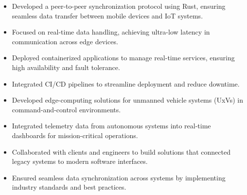 \par\smallskip
\noindent
\begin{minipage}{20cm}
  \begin{minipage}{9.75cm}
    \begin{itemize}
      \item Developed a peer-to-peer synchronization protocol using Rust, ensuring seamless data transfer between mobile devices and IoT systems.
      \item Focused on real-time data handling, achieving ultra-low latency in communication across edge devices.
    \end{itemize}
  \end{minipage}
  \hfill
  \begin{minipage}{9.75cm}
    \begin{itemize}
      \item Deployed containerized applications to manage real-time services, ensuring high availability and fault tolerance.
      \item Integrated CI/CD pipelines to streamline deployment and reduce downtime.
    \end{itemize}
  \end{minipage}
\end{minipage}
\par\smallskip
\divider

\par\smallskip
\noindent
\begin{minipage}{20cm}
  \begin{minipage}{9.75cm}
    \begin{itemize}
      \item Developed edge-computing solutions for unmanned vehicle systems (UxVs) in command-and-control environments.
      \item Integrated telemetry data from autonomous systems into real-time dashboards for mission-critical operations.
    \end{itemize}
  \end{minipage}
  \hfill
  \begin{minipage}{9.75cm}
    \begin{itemize}
      \item Collaborated with clients and engineers to build solutions that connected legacy systems to modern software interfaces.
      \item Ensured seamless data synchronization across systems by implementing industry standards and best practices.
    \end{itemize}
  \end{minipage}
\end{minipage}

